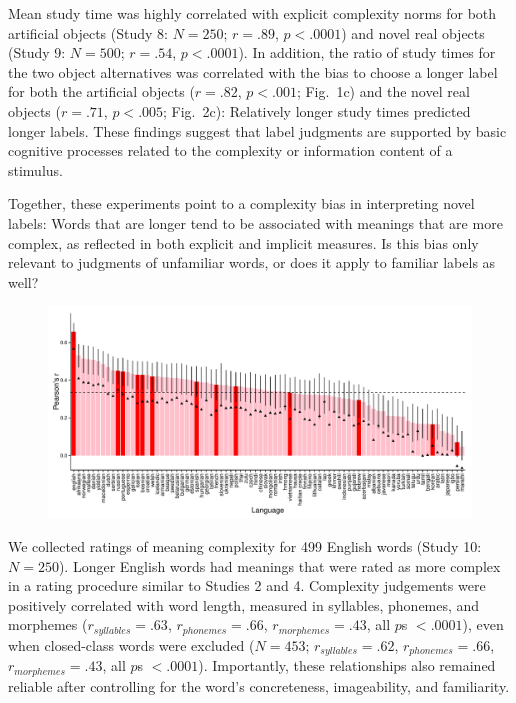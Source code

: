 \documentclass[12pt]{article}
\begin{document}
Mean study time was highly correlated with explicit complexity norms for both artificial objects (Study 8: $N = 250$; $r = .89$, $p < .0001$) and novel real objects (Study 9: $N = 500$; $r = .54$, $p < .0001$). In addition, the ratio of study times for the two object alternatives was correlated with the bias to choose a longer label for both the artificial objects ($r = .82$, $p < .001$; Fig.\ 1c) and the novel real objects ($r = .71$, $p < .005$; Fig.\ 2c): Relatively longer study times predicted longer labels. These findings suggest that label judgments are supported by basic cognitive processes related to the complexity or information content of a stimulus. 
					
Together, these experiments point to a complexity bias in interpreting novel labels: Words that are longer tend to be associated with meanings that are more complex, as reflected in both explicit and implicit measures. Is this bias only relevant to judgments of unfamiliar words, or does it apply to familiar labels as well? 

\begin{figure}[t]
\begin{center}
\includegraphics[scale = .53]{figs/xling.pdf}
\caption{} 
\end{center}
\label{fig:real_objs}
\end{figure}

We collected ratings of meaning complexity for 499 English words (Study 10: $N = 250$). Longer English words had meanings that were rated as more complex in a rating procedure similar to Studies 2 and 4. Complexity judgements were positively correlated with word length, measured in syllables, phonemes, and morphemes ($r_{syllables} = .63$, $r_{phonemes} = .66$, $r_{morphemes} = .43$, all $p$s $< .0001$), even when closed-class words were excluded ($N = 453$; $r_{syllables} = .62$, $r_{phonemes} = .66$, $r_{morphemes} = .43$, all $p$s $< .0001$). Importantly, these relationships also remained reliable after controlling for the word's concreteness, imageability, and familiarity. 
						
\end{document}
